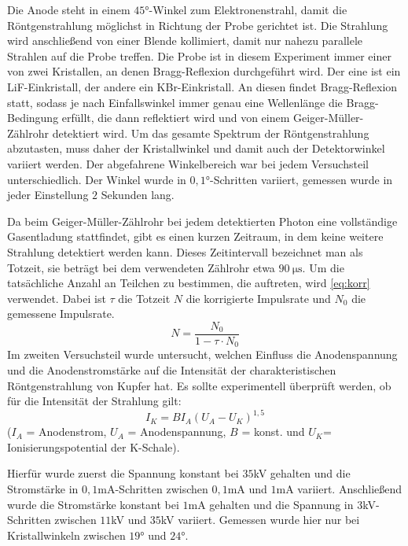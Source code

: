 \documentclass[
	a4paper,
	12pt,
	pagesize,
	ngerman
]{scrartcl}
\begin{document}
Die Anode steht in einem $45$°-Winkel zum Elektronenstrahl, damit die Röntgenstrahlung möglichst in Richtung der Probe gerichtet ist. Die Strahlung wird anschließend von einer Blende kollimiert, damit nur nahezu parallele Strahlen auf die Probe treffen. Die Probe ist in diesem Experiment immer einer von zwei Kristallen, an denen Bragg-Reflexion durchgeführt wird. Der eine ist ein LiF-Einkristall, der andere ein KBr-Einkristall. An diesen findet Bragg-Reflexion statt, sodass je nach Einfallswinkel immer genau eine Wellenlänge die Bragg-Bedingung erfüllt, die dann reflektiert wird und von einem Geiger-Müller-Zählrohr detektiert wird. Um das gesamte Spektrum der Röntgenstrahlung abzutasten, muss daher der Kristallwinkel und damit auch der Detektorwinkel variiert werden. Der abgefahrene Winkelbereich war bei jedem Versuchsteil unterschiedlich. Der Winkel wurde in $0,1$°-Schritten variiert, gemessen wurde in jeder Einstellung $2$ Sekunden lang.

Da beim Geiger-Müller-Zählrohr bei jedem detektierten Photon eine vollständige Gasentladung stattfindet, gibt es einen kurzen Zeitraum, in dem keine weitere Strahlung detektiert werden kann. Dieses Zeitintervall bezeichnet man als Totzeit, sie beträgt bei dem verwendeten Zählrohr etwa $\SI{90}{\micro \second}$. Um die tatsächliche Anzahl an Teilchen zu bestimmen, die auftreten, wird \cref{eq:korr} verwendet. Dabei ist $\tau$ die Totzeit $N$ die korrigierte Impulsrate und $N_0$ die gemessene Impulsrate.
\begin{equation}
	N = \frac{N_0}{1 - \tau \cdot N_0}
	\label{eq:korr}
\end{equation}
Im zweiten Versuchsteil wurde untersucht, welchen Einfluss die Anodenspannung und die Anodenstromstärke auf die Intensität der charakteristischen Röntgenstrahlung von Kupfer hat. Es sollte experimentell überprüft werden, ob für die Intensität der Strahlung gilt:
\begin{equation}
	I_K = B I_A (U_A - U_K)^{1,5}
	\label{eq:ik}
\end{equation}
($I_A$ = Anodenstrom, $U_A$ = Anodenspannung, $B$ = konst. und $U_K$= Ionisierungspotential der K-Schale).


Hierfür wurde zuerst die Spannung konstant bei $35$kV gehalten und die Stromstärke in $0,1$mA-Schritten zwischen $0,1$mA und $1$mA variiert. Anschließend wurde die Stromstärke konstant bei $1$mA gehalten und die Spannung in $3$kV-Schritten zwischen $11$kV und $35$kV variiert. Gemessen wurde hier nur bei Kristallwinkeln zwischen $19$° und $24$°.
\end{document}
